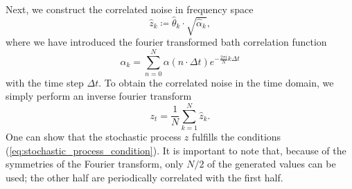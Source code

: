 Next, we construct the correlated noise in frequency space
\begin{equation*}
    \hat{z}_k \coloneqq \hat{\theta}_k \cdot \sqrt{\hat{\alpha}_k},
\end{equation*}
where we have introduced the fourier transformed bath correlation function
\begin{equation*}
    \hat{\alpha}_k = \sum_{n = 0}^{N} \alpha(n\cdot\Delta t) e^{-\frac{2\pi i}{N} k\Delta t}
\end{equation*}
with the time step $\Delta t$. To obtain the correlated noise in the time domain, we simply perform an inverse fourier transform
\begin{equation*}
    z_t = \frac{1}{N} \sum_{k = 1}^{N} \hat{z}_k.
\end{equation*}
One can show that the stochastic process $z$ fulfills the conditions (\ref{eq:stochastic_process_condition}).
It is important to note that, because of the symmetries of the Fourier transform, only $N/2$ of the generated
values can be used; the other half are periodically correlated with the first half. 
